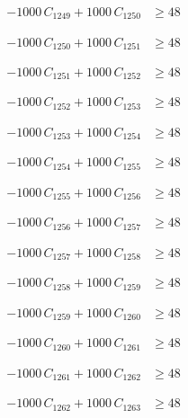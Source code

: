 \documentclass[a4paper,11pt]{article}
\begin{document}
\begin{align}
-1000\,C_{1249} + 1000\,C_{1250} &\geq 48 \nonumber
\end{align}

\begin{align}
-1000\,C_{1250} + 1000\,C_{1251} &\geq 48 \nonumber
\end{align}

\begin{align}
-1000\,C_{1251} + 1000\,C_{1252} &\geq 48 \nonumber
\end{align}

\begin{align}
-1000\,C_{1252} + 1000\,C_{1253} &\geq 48 \nonumber
\end{align}

\begin{align}
-1000\,C_{1253} + 1000\,C_{1254} &\geq 48 \nonumber
\end{align}

\begin{align}
-1000\,C_{1254} + 1000\,C_{1255} &\geq 48 \nonumber
\end{align}

\begin{align}
-1000\,C_{1255} + 1000\,C_{1256} &\geq 48 \nonumber
\end{align}

\begin{align}
-1000\,C_{1256} + 1000\,C_{1257} &\geq 48 \nonumber
\end{align}

\begin{align}
-1000\,C_{1257} + 1000\,C_{1258} &\geq 48 \nonumber
\end{align}

\begin{align}
-1000\,C_{1258} + 1000\,C_{1259} &\geq 48 \nonumber
\end{align}

\begin{align}
-1000\,C_{1259} + 1000\,C_{1260} &\geq 48 \nonumber
\end{align}

\begin{align}
-1000\,C_{1260} + 1000\,C_{1261} &\geq 48 \nonumber
\end{align}

\begin{align}
-1000\,C_{1261} + 1000\,C_{1262} &\geq 48 \nonumber
\end{align}

\begin{align}
-1000\,C_{1262} + 1000\,C_{1263} &\geq 48 \nonumber
\end{align}
\end{document}
